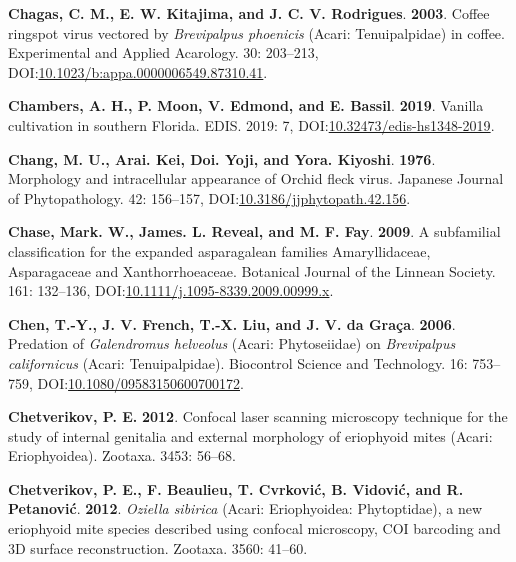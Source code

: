 \documentclass[12pt,final,CPage]{ufthesis}
\newlength{\cslhangindent}
\newenvironment{CSLReferences}[2] %
{%
	\setlength{\parindent}{0pt}
	\ifodd #1 \everypar{\setlength{\hangindent}{\cslhangindent}}\ignorespaces\fi
	\ifnum #2 > 0
	\setlength{\parskip}{#2\baselineskip}
	\fi
}%
{}
\begin{document}
{\begin{CSLReferences}{1}{0}
  \leavevmode{}%
  \textbf{Chagas, C. M., E. W. Kitajima, and J. C. V. Rodrigues}. \textbf{2003}. {Coffee ringspot virus} vectored by {\emph{Brevipalpus phoenicis}} ({Acari}: {Tenuipalpidae}) in coffee. Experimental and Applied Acarology. 30: 203--213, DOI:\href{https://doi.org/10.1023/b:appa.0000006549.87310.41}{10.1023/b:appa.0000006549.87310.41}.

  \leavevmode{}%
  \textbf{Chambers, A. H., P. Moon, V. Edmond, and E. Bassil}. \textbf{2019}. Vanilla cultivation in southern {Florida}. {EDIS}. 2019: 7, DOI:\href{https://doi.org/10.32473/edis-hs1348-2019}{10.32473/edis-hs1348-2019}.

  \leavevmode{}%
  \textbf{Chang, M. U., Arai. Kei, Doi. Yoji, and Yora. Kiyoshi}. \textbf{1976}. Morphology and intracellular appearance of {Orchid fleck virus}. Japanese Journal of Phytopathology. 42: 156--157, DOI:\href{https://doi.org/10.3186/jjphytopath.42.156}{10.3186/jjphytopath.42.156}.

  \leavevmode{}%
  \textbf{Chase, Mark. W., James. L. Reveal, and M. F. Fay}. \textbf{2009}. A subfamilial classification for the expanded asparagalean families {Amaryllidaceae}, {Asparagaceae} and {Xanthorrhoeaceae}. Botanical Journal of the Linnean Society. 161: 132--136, DOI:\href{https://doi.org/10.1111/j.1095-8339.2009.00999.x}{10.1111/j.1095-8339.2009.00999.x}.

  \leavevmode{}%
  \textbf{Chen, T.-Y., J. V. French, T.-X. Liu, and J. V. da Graça}. \textbf{2006}. Predation of {\emph{Galendromus helveolus}} ({Acari}: {Phytoseiidae}) on {\emph{Brevipalpus californicus}} ({Acari}: {Tenuipalpidae}). Biocontrol Science and Technology. 16: 753--759, DOI:\href{https://doi.org/10.1080/09583150600700172}{10.1080/09583150600700172}.

  \leavevmode{}%
  \textbf{Chetverikov, P. E.} \textbf{2012}. Confocal laser scanning microscopy technique for the study of internal genitalia and external morphology of eriophyoid mites ({Acari}: {Eriophyoidea}). Zootaxa. 3453: 56--68.

  \leavevmode{}%
  \textbf{Chetverikov, P. E., F. Beaulieu, T. Cvrković, B. Vidović, and R. Petanović}. \textbf{2012}. {\emph{Oziella sibirica}} ({Acari}: {Eriophyoidea}: {Phytoptidae}), a new eriophyoid mite species described using confocal microscopy, {COI} barcoding and {3D} surface reconstruction. Zootaxa. 3560: 41--60.


\end{CSLReferences}}
\end{document}
